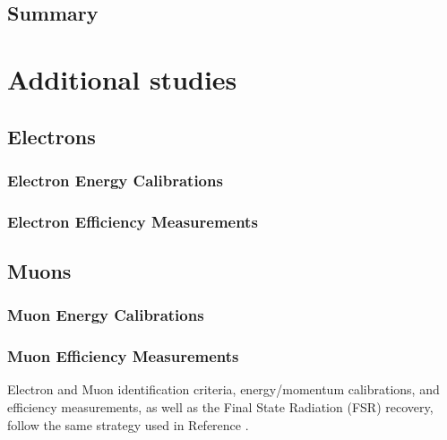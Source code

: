 \subsection{Summary}


\section{Additional studies}
\subsection{Electrons}
\subsubsection{Electron Energy Calibrations}

\subsubsection{Electron Efficiency Measurements}
\label{sec:eleEffMeas}


\subsection{Muons}
\subsubsection{Muon Energy Calibrations}

\subsubsection{Muon Efficiency Measurements}
\label{sec:muonEffMeas}

%

Electron and Muon identification criteria, energy/momentum calibrations, and efficiency measurements,
as well as the Final State Radiation (FSR) recovery, follow the same strategy used in Reference . %
